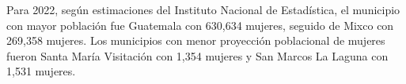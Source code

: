 \justifying Para 2022, según estimaciones del Instituto Nacional de Estadística, el municipio con mayor población fue Guatemala con 630,634 mujeres, seguido de Mixco con 269,358 mujeres. Los municipios con menor proyección poblacional de mujeres fueron Santa María Visitación con 1,354 mujeres y San Marcos La Laguna con 1,531 mujeres.  